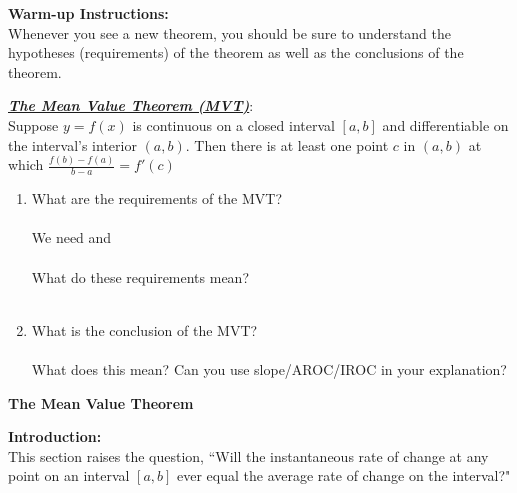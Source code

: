 \documentclass[12pt]{report}
\begin{document}
\pagestyle{empty}

\textbf{Warm-up Instructions:} \\
Whenever you see a new theorem, you should be sure to understand the hypotheses (requirements) of the theorem as well as the conclusions of the theorem. 

\bigskip
\textbf{\emph{\underline{The Mean Value Theorem (MVT)}}}: \\

Suppose $y=f(x)$ is continuous on a closed interval $[a,b]$ and differentiable on the interval's interior $(a,b)$. Then there is at least one point $c$ in $(a,b)$ at which $\displaystyle\frac{f(b)-f(a)}{b-a}=f'(c)$
\begin{enumerate}
\item What are the requirements of the MVT? \\
\vspace{.1in}\\
We need \underline{\hspace{3in}} and \underline{\hspace{3in}} \\
\vspace{.1in}\\
What do these requirements mean? \\
\vspace{1in}\\
\item What is the conclusion of the MVT? \\
\vspace{1in}\\
What does this mean? Can you use slope/AROC/IROC in your explanation?

\vspace{1.5 in}

\end{enumerate}

\newpage

\begin{center}
\textbf{The Mean Value Theorem}
\end{center}

\textbf{Introduction:} \\

This section raises the question, ``Will the instantaneous rate of change at any point on an interval $[a, b]$ ever equal the average rate of change on the interval?" \\
\end{document}
